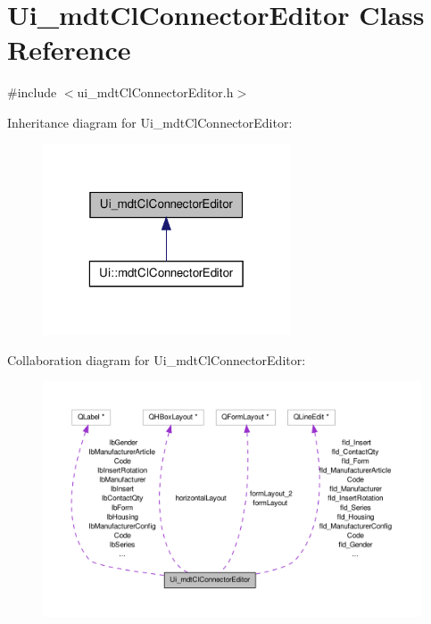 \hypertarget{class_ui__mdt_cl_connector_editor}{\section{Ui\-\_\-mdt\-Cl\-Connector\-Editor Class Reference}
\label{class_ui__mdt_cl_connector_editor}
}


{\ttfamily \#include $<$ui\-\_\-mdt\-Cl\-Connector\-Editor.\-h$>$}



Inheritance diagram for Ui\-\_\-mdt\-Cl\-Connector\-Editor\-:
\nopagebreak
\begin{figure}[H]
\begin{center}
\leavevmode
\includegraphics[width=208pt]{class_ui__mdt_cl_connector_editor__inherit__graph}
\end{center}
\end{figure}


Collaboration diagram for Ui\-\_\-mdt\-Cl\-Connector\-Editor\-:
\nopagebreak
\begin{figure}[H]
\begin{center}
\leavevmode
\includegraphics[width=350pt]{class_ui__mdt_cl_connector_editor__coll__graph}
\end{center}
\end{figure}
